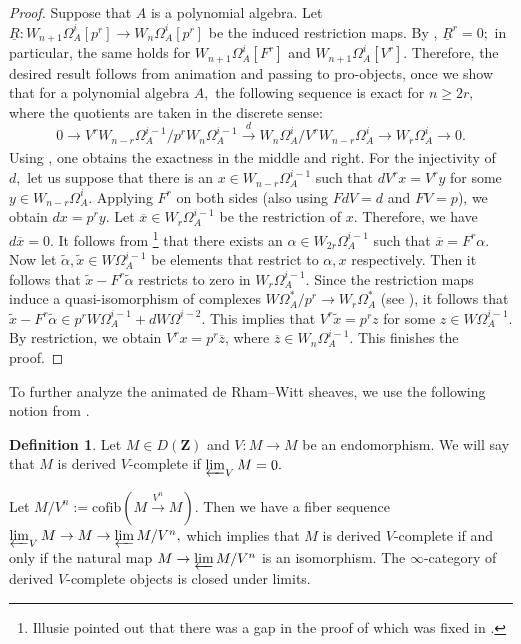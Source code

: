 \documentclass[10pt,letterpaper]{amsart}
\numberwithin{figure}{section}
\numberwithin{equation}{section}
\theoremstyle{definition}
\newtheorem{definition}[figure]{Definition}
\theoremstyle{definition}
\theoremstyle{definition}
\theoremstyle{definition}
\newcommand{\Z}{\mathbf{Z}}
\begin{document}
\begin{proof}
Suppose that $A$ is a polynomial algebra. Let $\underline{R}: W_{n+1} \Omega^i_A [p^r] \to W_{n} \Omega^i_A [p^r]$ be the induced restriction maps. By \cite[Prop.~3.4]{Luc1}, $\underline{R}^r = 0;$ in particular, the same holds for $W_{n+1}\Omega^i_A[F^r]$ and $W_{n+1}\Omega^i_A[V^r]$. Therefore, the desired result follows from animation and passing to pro-objects, once we show that for a polynomial algebra $A,$ the following sequence is exact for $n \ge 2r,$ where the quotients are taken in the discrete sense:
 $$0 \to V^r W_{n-r} \Omega^{i-1}_A /p^r W_n \Omega^{i-1}_A \xrightarrow[]{d} W_n \Omega^i_A/V^r W_{n-r}\Omega^i_A \to W_r\Omega^i_A \to 0.$$
 Using \cite[{Prop.~3.2}]{Luc1}, one obtains the exactness in the middle and right. For the injectivity of $d,$ let us suppose that there is an $x \in W_{n-r}\Omega^{i-1}_A$ such that $dV^r x = V^r y$ for some $y \in W_{n-r}\Omega^i_A.$ Applying $F^r$ on both sides (also using $FdV= d$ and $FV= p$), we obtain $dx = p^r y.$ Let $\overline{x} \in W_r \Omega^{i-1}_A$ be the restriction of $x.$ Therefore, we have $d \overline{x} = 0.$ It follows from \cite[Prop.~3.21]{Luc1}\footnote{Illusie pointed out that there was a gap in the proof of \cite[Prop.~3.21]{Luc1} which was fixed in \cite[II,~1.3]{Luc11}.} that there exists an $\alpha \in W_{2r}\Omega^{i-1}_A$ such that $\overline{x} = F^r \alpha.$
 Now let $\widetilde{\alpha}, \widetilde{x} \in W\Omega^{i-1}_A$ be elements that restrict to $\alpha, x$ respectively.
Then it follows that $\widetilde{x} - F^r \widetilde{\alpha}$ restricts to zero in $W_r \Omega^{i-1}_A.$ Since the restriction maps induce a quasi-isomorphism of complexes $W\Omega^*_A/p^r \to W_r\Omega^*_A$ (see \cite[Cor.~3.17]{Luc1}), it follows that $\widetilde{x} - F^r\widetilde{\alpha} \in p^r W\Omega^{i-1}_A + d W\Omega^{i-2}.$ This implies that $V^r \widetilde{x} = p^r z$ for some $z \in W\Omega^{i-1}_A.$ By restriction, we obtain $V^rx = p^r \overline{z}$, where $\overline{z} \in W_n\Omega^{i-1}_A.$ This finishes the proof.
\end{proof}{}

To further analyze the animated de Rham--Witt sheaves, we use the following notion from \cite{Ben}.


\begin{definition} Let $M \in D(\Z)$ and $V: M \to M$ be an endomorphism. We will say that $M$ is derived $V$-complete if $\varprojlim_V M =0.$
\end{definition}{}

Let $M/V^n:= \mathrm{cofib} (M \xrightarrow[]{V^n}M).$ Then we have a fiber sequence $\varprojlim_{V}M \to M \to  \varprojlim M/V^n,$ which implies that $M$ is derived $V$-complete if and only if the natural map $M \to \varprojlim M/V^n$ is an isomorphism. The $\infty$-category of derived $V$-complete objects is closed under limits.
\end{document}
